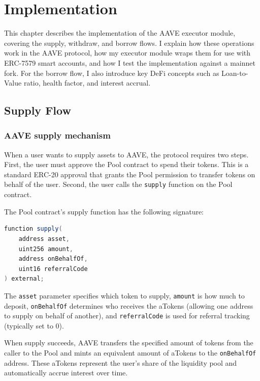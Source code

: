 \chapter{Implementation}
\label{chap:implementation}

This chapter describes the implementation of the AAVE executor module, covering the supply, withdraw, and borrow flows. I explain how these operations work in the AAVE protocol, how my executor module wraps them for use with ERC-7579 smart accounts, and how I test the implementation against a mainnet fork. For the borrow flow, I also introduce key DeFi concepts such as Loan-to-Value ratio, health factor, and interest accrual.

\section{Supply Flow}

\subsection{AAVE supply mechanism}

When a user wants to supply assets to AAVE, the protocol requires two steps. First, the user must approve the Pool contract to spend their tokens. This is a standard ERC-20 approval that grants the Pool permission to transfer tokens on behalf of the user. Second, the user calls the \texttt{supply} function on the Pool contract.

The Pool contract's supply function has the following signature:

\begin{lstlisting}[language=Java,caption={AAVE Pool supply function},label=lst:pool-supply]
function supply(
    address asset,
    uint256 amount,
    address onBehalfOf,
    uint16 referralCode
) external;
\end{lstlisting}

The \texttt{asset} parameter specifies which token to supply, \texttt{amount} is how much to deposit, \texttt{onBehalfOf} determines who receives the aTokens (allowing one address to supply on behalf of another), and \texttt{referralCode} is used for referral tracking (typically set to 0).

When supply succeeds, AAVE transfers the specified amount of tokens from the caller to the Pool and mints an equivalent amount of aTokens to the \texttt{onBehalfOf} address. These aTokens represent the user's share of the liquidity pool and automatically accrue interest over time.

